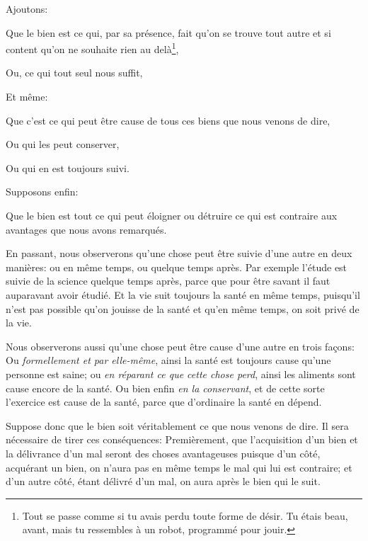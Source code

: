 Ajoutons:

\begin{emphpar}
	Que le bien est ce qui, par sa présence, fait qu'on se trouve tout autre et si content qu'on ne souhaite rien au
	delà\footnote{Tout se passe comme si tu avais perdu toute forme de désir. Tu étais beau, avant, mais tu ressembles
	à un robot, programmé pour jouir.},

	Ou, ce qui tout seul nous suffit,
\end{emphpar}

Et même:

\begin{emphpar}
	Que c'est ce qui peut être cause de tous ces biens que nous venons de dire,

	Ou qui les peut conserver,

	Ou qui en est toujours suivi.
\end{emphpar}

\bigbreak

Supposons enfin:

\begin{emphpar}
	Que le bien est tout ce qui peut éloigner ou détruire ce qui est contraire aux avantages que nous avons remarqués.
\end{emphpar}

En passant, nous observerons qu'une chose peut être suivie d'une autre en deux manières: ou en même temps, ou quelque temps
après. Par exemple l'étude est suivie de la science quelque temps après, parce que pour être savant il faut auparavant
avoir étudié. Et la vie suit toujours la santé en même temps, puisqu'il n'est pas possible qu'on jouisse de la santé et
qu'en même temps, on soit privé de la vie.

Nous observerons aussi qu'une chose peut être cause d'une autre en trois façons: Ou \emph{formellement et par elle-même},
ainsi la santé est toujours cause qu'une personne est saine; ou \emph{en réparant ce que cette chose perd}, ainsi les
aliments sont cause encore de la santé. Ou bien enfin \emph{en la conservant}, et de cette sorte l'exercice est cause de
la santé, parce que d'ordinaire la santé en dépend.

\bigbreak

Suppose donc que le bien soit véritablement ce que nous venons de dire. Il sera nécessaire de tirer ces conséquences:
Premièrement, que l'acquisition d'un bien et la délivrance d'un mal seront des choses avantageuses puisque d'un côté,
acquérant un bien, on n'aura pas en même temps le mal qui lui est contraire; et d'un autre côté, étant délivré d'un
mal, on aura après le bien qui le suit. 

